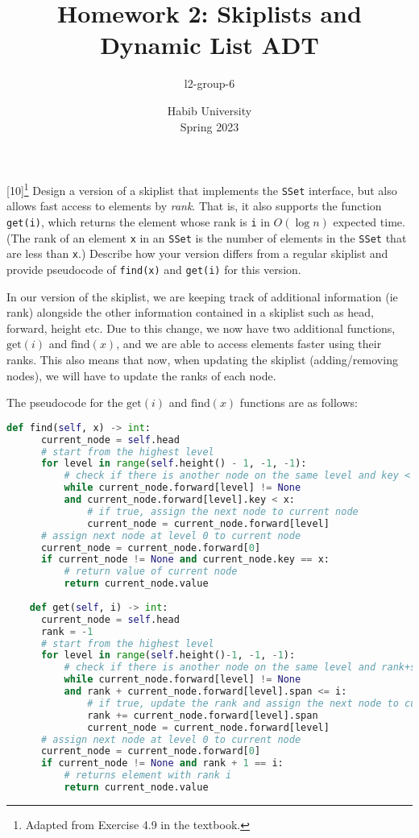 \documentclass[addpoints]{exam}
\title{Homework 2: Skiplists and Dynamic List ADT}
\author{l2-group-6}  %
\date{Habib University\\Spring 2023}
\begin{document}
\begin{questions}

  [10]\footnote{Adapted from Exercise 4.9 in the textbook.}
  Design a version of a skiplist that implements the \texttt{SSet} interface, but also allows fast access to elements by \textit{rank}. That is, it also supports the function \texttt{get(i)}, which returns the element whose rank is \texttt{i} in $O(\log n)$ expected time. (The rank of an element \texttt{x} in an \texttt{SSet} is the number of elements in the \texttt{SSet} that are less than \texttt{x}.)
  Describe how your version differs from a regular skiplist and provide pseudocode of \texttt{find(x)} and \texttt{get(i)} for this version.
  \begin{solution}
    In our version of the skiplist, we are keeping track of additional information (ie rank) alongside the other information contained in a skiplist such as head, forward, height etc. Due to this change, we now have two additional functions, $\text{get}(i)$ and $\text{find}(x)$, and we are able to access elements faster using their ranks. This also means that now, when updating the skiplist (adding/removing nodes), we will have to update the ranks of each node.
    \par The pseudocode for the $\text{get}(i)$ and $\text{find}(x)$ functions are as follows:
    \begin{lstlisting}[language=Python]
    def find(self, x) -> int:
      current_node = self.head
      # start from the highest level
      for level in range(self.height() - 1, -1, -1):         
          # check if there is another node on the same level and key < x 
          while current_node.forward[level] != None           
          and current_node.forward[level].key < x:
              # if true, assign the next node to current node             
              current_node = current_node.forward[level]   
      # assign next node at level 0 to current node           
      current_node = current_node.forward[0]                  
      if current_node != None and current_node.key == x:
          # return value of current node
          return current_node.value                           
  
    def get(self, i) -> int:
      current_node = self.head
      rank = -1
      # start from the highest level
      for level in range(self.height()-1, -1, -1):
          # check if there is another node on the same level and rank+span < i           
          while current_node.forward[level] != None         
          and rank + current_node.forward[level].span <= i: 
              # if true, update the rank and assign the next node to current node
              rank += current_node.forward[level].span        
              current_node = current_node.forward[level]     
      # assign next node at level 0 to current node
      current_node = current_node.forward[0]                  
      if current_node != None and rank + 1 == i:
          # returns element with rank i
          return current_node.value                           
      \end{lstlisting}
  \end{solution}


\end{questions}
\end{document}
